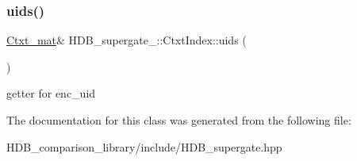 \subsubsection{\texorpdfstring{uids()}{uids()}\hspace{0.1cm}{\footnotesize\ttfamily [2/2]}}
{\footnotesize\ttfamily \hyperlink{namespaceHDB__supergate___a46a3fb2b98c95dc7615203376c4ad0c8}{Ctxt\+\_\+mat}\& H\+D\+B\+\_\+supergate\+\_\+\+::\+Ctxt\+Index\+::uids (\begin{DoxyParamCaption}{ }\end{DoxyParamCaption})\hspace{0.3cm}{\ttfamily [inline]}}

getter for enc\+\_\+uid 

The documentation for this class was generated from the following file\+:\begin{DoxyCompactItemize}
\item 
H\+D\+B\+\_\+comparison\+\_\+library/include/H\+D\+B\+\_\+supergate.\+hpp\end{DoxyCompactItemize}
